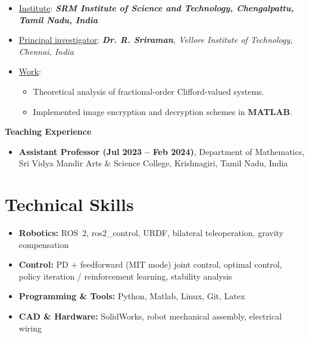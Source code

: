 \documentclass[A4,11pt]{article}
\begin{document}
\begin{itemize}
\begin{itemize}
		\item[] \underline{Institute}: \textit{\textbf{SRM Institute of Science and Technology, Chengalpattu, Tamil Nadu, India}}
		\item[] \underline{Principal investigator}: \textit{\textbf{Dr. R. Sriraman}, Vellore Institute of Technology, Chennai, India}
		\item[] \underline{Work}:
		\begin{itemize}
			\item Theoretical analysis of fractional-order Clifford-valued systems.
			\item Implemented image encryption and decryption schemes in \textbf{MATLAB}.
		\end{itemize}
	\end{itemize}
\end{itemize}
\textbf{Teaching Experience}
\begin{itemize}
	\item \textbf{Assistant Professor (Jul 2023 -- Feb 2024)}, Department of Mathematics, Sri Vidya Mandir Arts \& Science College, Krishnagiri, Tamil Nadu, India
\end{itemize}

\section{\textbf{\huge Technical Skills}}
\begin{itemize}[leftmargin=0.5cm, label={}]
	\item \textbf{Robotics:} ROS~2, ros2\_control, URDF, bilateral teleoperation, gravity compensation
	\item \textbf{Control:} PD + feedforward (MIT mode) joint control, optimal control, policy iteration / reinforcement learning, stability analysis
	\item \textbf{Programming \& Tools:} Python, Matlab, Linux, Git, Latex
	\item \textbf{CAD \& Hardware:} SolidWorks, robot mechanical assembly, electrical wiring
\end{itemize}

\end{document}

